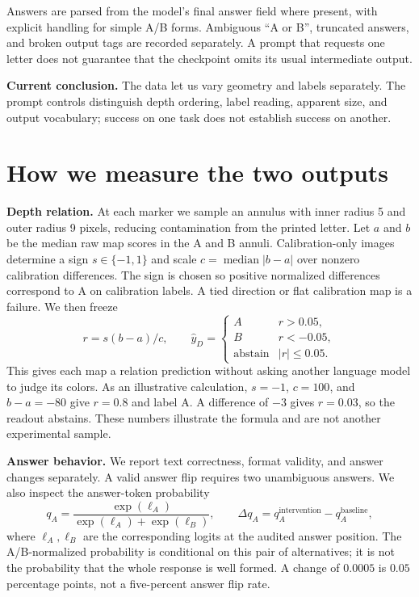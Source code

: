 \documentclass[11pt]{article}
\newcommand{\takeaway}[1]{\par\noindent\textbf{Current conclusion.} #1\par}
\begin{document}
Answers are parsed from the model's final answer field where present, with explicit handling for simple A/B forms. Ambiguous ``A or B'', truncated answers, and broken output tags are recorded separately. A prompt that requests one letter does not guarantee that the checkpoint omits its usual intermediate output.
\takeaway{The data let us vary geometry and labels separately. The prompt controls distinguish depth ordering, label reading, apparent size, and output vocabulary; success on one task does not establish success on another.}
\FloatBarrier

\section{How we measure the two outputs}
\textbf{Depth relation.} At each marker we sample an annulus with inner radius 5 and outer radius 9 pixels, reducing contamination from the printed letter. Let $a$ and $b$ be the median raw map scores in the A and B annuli. Calibration-only images determine a sign $s\in\{-1,1\}$ and scale $c=\operatorname{median}|b-a|$ over nonzero calibration differences. The sign is chosen so positive normalized differences correspond to A on calibration labels. A tied direction or flat calibration map is a failure. We then freeze
\begin{equation}
 r=s(b-a)/c,\qquad
 \widehat y_D=\begin{cases}A&r>0.05,\\B&r<-0.05,\\\text{abstain}&|r|\leq0.05.\end{cases}
\end{equation}
This gives each map a relation prediction without asking another language model to judge its colors. As an illustrative calculation, $s=-1$, $c=100$, and $b-a=-80$ give $r=0.8$ and label A. A difference of $-3$ gives $r=0.03$, so the readout abstains. These numbers illustrate the formula and are not another experimental sample.

\textbf{Answer behavior.} We report text correctness, format validity, and answer changes separately. A valid answer flip requires two unambiguous answers. We also inspect the answer-token probability
\begin{equation}
 q_A=\frac{\exp(\ell_A)}{\exp(\ell_A)+\exp(\ell_B)},\qquad
 \Delta q_A=q_A^{\mathrm{intervention}}-q_A^{\mathrm{baseline}},
\end{equation}
where $\ell_A,\ell_B$ are the corresponding logits at the audited answer position. The A/B-normalized probability is conditional on this pair of alternatives; it is not the probability that the whole response is well formed. A change of $0.0005$ is $0.05$ percentage points, not a five-percent answer flip rate.
\end{document}
